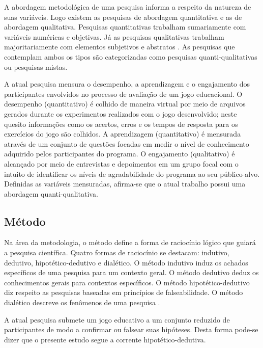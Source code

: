 A abordagem metodológica de uma pesquisa informa a respeito da natureza de suas variáveis. Logo existem as pesquisas de abordagem quantitativa e as de abordagem qualitativa. Pesquisas quantitativas trabalham sumariamente com variáveis numéricas e objetivas. Já as pesquisas qualitativas trabalham majoritariamente com elementos subjetivos e abstratos \cite{carlos2002elaborar}. As pesquisas que contemplam ambos os tipos são categorizadas como pesquisas quanti-qualitativas ou pesquisas mistas. 

A atual pesquisa mensura o desempenho, a aprendizagem e o engajamento dos participantes envolvidos no processo de avaliação de um jogo educacional. O desempenho (quantitativo) é colhido de maneira virtual por meio de arquivos gerados durante os experimentos realizados com o jogo desenvolvido; neste quesito informações como os acertos, erros e os tempos de resposta para os exercícios do jogo são colhidos. A aprendizagem (quantitativo) é mensurada através de um conjunto de questões focadas em medir o nível de conhecimento adquirido pelos participantes do programa. O engajamento (qualitativo) é alcançado por meio de entrevistas e depoimentos em um grupo focal com o intuito de identificar os níveis de agradabilidade do programa ao seu público-alvo. Definidas as variáveis mensuradas, afirma-se que o atual trabalho possui uma abordagem quanti-qualitativa. 

\subsection{Método}\label{sub:Metodo}

Na área da metodologia, o método define a forma de raciocínio lógico que guiará a pesquisa científica. Quatro formas de raciocínio se destacam: indutivo, dedutivo, hipotético-dedutivo e dialético. O método indutivo induz os achados específicos de uma pesquisa para um contexto geral. O método dedutivo deduz os conhecimentos gerais para contextos específicos. O método hipotético-dedutivo diz respeito as pesquisas baseadas em princípios de falseabilidade. O método dialético descreve os fenômenos de uma pesquisa \cite{marconi2003lakatos}.  

A atual pesquisa submete um jogo educativo a um conjunto reduzido de participantes de modo a confirmar ou falsear suas hipóteses. Desta forma pode-se dizer que o presente estudo segue a corrente hipotético-dedutiva.



